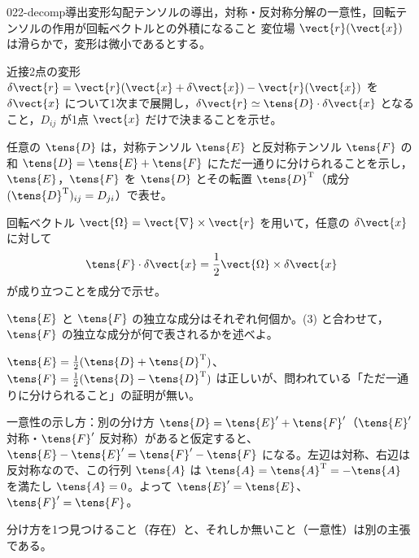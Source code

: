 \documentclass[uplatex,dvipdfmx,a4paper,11pt]{jsarticle}
\begin{document}
\begin{mondai}{022-decomp}{導出}{変形勾配テンソルの導出，対称・反対称分解の一意性，回転テンソルの作用が回転ベクトルとの外積になること}
変位場 $\vect{r}(\vect{x})$ は滑らかで，変形は微小であるとする。
  \begin{shoumon}
    \item 近接2点の変形 $\delta\vect{r}=\vect{r}(\vect{x}+\delta\vect{x})-\vect{r}(\vect{x})$ を $\delta\vect{x}$ について1次まで展開し，$\delta\vect{r}\simeq\tens{D}\cdot\delta\vect{x}$ となること，$D_{ij}$ が1点 $\vect{x}$ だけで決まることを示せ。
    \item 任意の $\tens{D}$ は，対称テンソル $\tens{E}$ と反対称テンソル $\tens{F}$ の和 $\tens{D}=\tens{E}+\tens{F}$ にただ一通りに分けられることを示し，$\tens{E}$，$\tens{F}$ を $\tens{D}$ とその転置 $\tens{D}^{\mathrm{T}}$（成分 $(\tens{D}^{\mathrm{T}})_{ij}=D_{ji}$）で表せ。
    \item 回転ベクトル $\vect{\Omega}=\vect{\nabla}\times\vect{r}$ を用いて，任意の $\delta\vect{x}$ に対して
    \[ \tens{F}\cdot\delta\vect{x}=\frac{1}{2}\vect{\Omega}\times\delta\vect{x} \]
    が成り立つことを成分で示せ。
    \item $\tens{E}$ と $\tens{F}$ の独立な成分はそれぞれ何個か。(3) と合わせて，$\tens{F}$ の独立な成分が何で表されるかを述べよ。
  \end{shoumon}

\begin{kotaeran}
   $\tens{E}=\frac{1}{2}(\tens{D}+\tens{D}^{\mathrm{T}})$、$\tens{F}=\frac{1}{2}(\tens{D}-\tens{D}^{\mathrm{T}})$ は正しいが、問われている「ただ一通りに分けられること」の証明が無い。
\end{kotaeran}
\begin{rikai}
  \item 一意性の示し方：別の分け方 $\tens{D}=\tens{E}'+\tens{F}'$（$\tens{E}'$ 対称・$\tens{F}'$ 反対称）があると仮定すると、$\tens{E}-\tens{E}'=\tens{F}'-\tens{F}$ になる。左辺は対称、右辺は反対称なので、この行列 $\tens{A}$ は $\tens{A}=\tens{A}^{\mathrm{T}}=-\tens{A}$ を満たし $\tens{A}=0$。よって $\tens{E}'=\tens{E}$、$\tens{F}'=\tens{F}$。
  \item 分け方を1つ見つけること（存在）と、それしか無いこと（一意性）は別の主張である。
\end{rikai}
\end{mondai}
\end{document}
